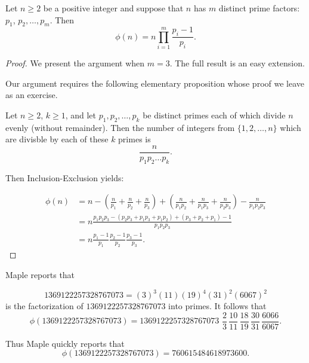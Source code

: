 \begin{theorem}\label{thm:eulerphi}
Let $n\ge2$ be a positive integer and suppose that 
$n$ has $m$ distinct prime factors: $p_1$, $p_2,\dots,p_m$.
Then
\begin{equation}\label{eq:eulerphi}
\phi(n) = n\prod_{i = 1}^{m}\frac{p_i-1}{p_i}.
\end{equation}
\end{theorem}
\begin{proof}  We present the argument when $m=3$. The full result
is an easy extension.

Our argument requires the following elementary proposition
whose proof we leave as an exercise.

\begin{proposition}\label{prop:num-divisible}
Let $n\ge2$, $k\ge1$, and let $p_1,p_2,\dots,p_k$ be distinct primes each
of which divide $n$ evenly (without remainder). 
Then the number of integers from $\{1,2,\dots,n\}$ which are
divisble by each of these $k$ primes is
\[
\frac{n}{p_1p_2\dots p_k}.
\]
\end{proposition}

Then Inclusion-Exclusion yields:

\begin{align*}
\phi(n) &= n -\left(\frac{n}{p_1}+\frac{n}{p_2}+\frac{n}{p_3}\right) +
  \left(\frac{n}{p_1p_2}+\frac{n}{p_1p_3}+\frac{n}{p_2p_3}\right)-\frac{n}{p_1p_2p_3}\\
   &= n \frac{p_1p_2p_3 -(p_2p_3+p_1p_3+p_1p_2)+
      (p_3+p_2+p_1) - 1}{p_1p_2p_3}\\
   &=n \frac{p_1-1}{p_1}\frac{p_2-1}{p_2}\frac{p_3-1}{p_3}.
\end{align*}

\end{proof}

\begin{example}

Maple reports that

\[
1369122257328767073 = (3)^3(11)(19)^4(31)^2(6067)^2
\]
is the factorization of $1369122257328767073$ into primes.
It follows that
\[
\phi(1369122257328767073) = 1369122257328767073
\,\,\frac{2}{3}\,\frac{10}{11}\,\frac{18}{19}\,\frac{30}{31}\,\frac{6066}{6067}.
\]

Thus Maple quickly reports that
\[
\phi(1369122257328767073) =760615484618973600.
\]

\end{example}

